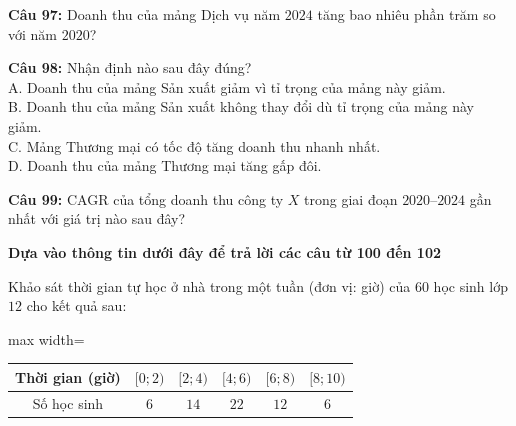 \documentclass[12pt,a4paper]{article}
\begin{document}
\noindent \textbf{Câu 97:} Doanh thu của mảng Dịch vụ năm $2024$ tăng bao nhiêu phần trăm so với năm $2020$?\\
\noindent{}



\vspace{0.3cm}

\noindent \textbf{Câu 98:} Nhận định nào sau đây đúng?\\
\noindent A. Doanh thu của mảng Sản xuất giảm vì tỉ trọng của mảng này giảm.\\
\noindent B. Doanh thu của mảng Sản xuất không thay đổi dù tỉ trọng của mảng này giảm.\\
\noindent C. Mảng Thương mại có tốc độ tăng doanh thu nhanh nhất.\\
\noindent D. Doanh thu của mảng Thương mại tăng gấp đôi.



\vspace{0.3cm}

\noindent \textbf{Câu 99:} CAGR của tổng doanh thu công ty $X$ trong giai đoạn $2020$--$2024$ gần nhất với giá trị nào sau đây?\\
\noindent{}



\vspace{0.5cm}
\noindent\textbf{Dựa vào thông tin dưới đây để trả lời các câu từ 100 đến 102}%


\par\nobreak

Khảo sát thời gian tự học ở nhà trong một tuần (đơn vị: giờ) của $60$ học sinh lớp $12$ cho kết quả sau:

\begin{center}
\begin{adjustbox}{max width=\linewidth}
\begin{tabular}{|c|c|c|c|c|c|}
\hline
Thời gian (giờ) & $[0;2)$ & $[2;4)$ & $[4;6)$ & $[6;8)$ & $[8;10)$ \\ \hline
Số học sinh & $6$ & $14$ & $22$ & $12$ & $6$ \\ \hline
\end{tabular}
\end{adjustbox}
\end{center}
\end{document}
